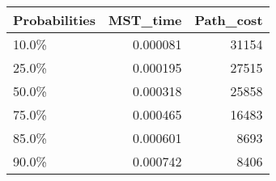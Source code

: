\begin{tabular}{lrr}
\toprule
Probabilities &  MST\_time &  Path\_cost \\
\midrule
        10.0\% &  0.000081 &      31154 \\
        25.0\% &  0.000195 &      27515 \\
        50.0\% &  0.000318 &      25858 \\
        75.0\% &  0.000465 &      16483 \\
        85.0\% &  0.000601 &       8693 \\
        90.0\% &  0.000742 &       8406 \\
\bottomrule
\end{tabular}
